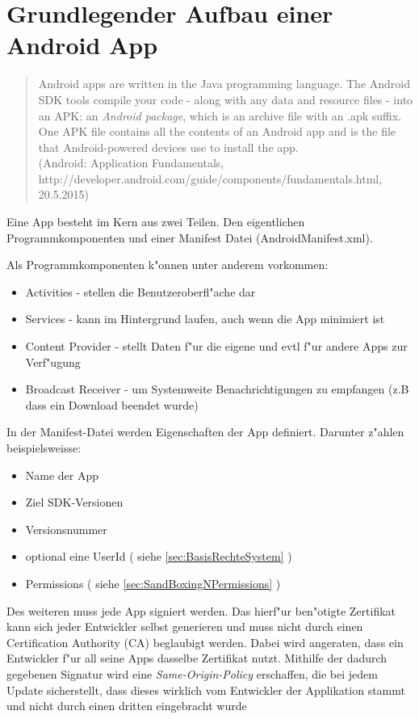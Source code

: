 	\section{Grundlegender Aufbau einer Android App}
	\begin{quote}
	Android apps are written in the Java programming language. The Android SDK tools compile your code - along with any data and resource files - into an APK: an \textit{Android package}, which is an archive file with an .apk suffix. One APK file contains all the contents of an Android app and is the file that Android-powered devices use to install the app.\\
	(Android: Application Fundamentals,\\ http://developer.android.com/guide/components/fundamentals.html,\\ 20.5.2015)
	\end{quote}
	
\begin{flushleft}
	Eine App besteht im Kern aus zwei Teilen. Den eigentlichen Programmkomponenten und einer Manifest Datei (AndroidManifest.xml).\\
\end{flushleft}
	Als Programmkomponenten k"onnen unter anderem vorkommen:
	\begin{itemize}\itemsep0pt
		\item Activities - stellen die Benutzeroberfl"ache dar
		\item Services - kann im Hintergrund laufen, auch wenn die App minimiert ist
		\item Content Provider - stellt Daten f"ur die eigene und evtl f"ur andere Apps zur Verf"ugung
		\item Broadcast Receiver - um Systemweite Benachrichtigungen zu empfangen (z.B dass ein Download beendet wurde)
	\end{itemize}
	In der Manifest-Datei werden Eigenschaften der App definiert. Darunter z"ahlen beispielsweisse:
	\begin{itemize}\itemsep0pt
		\item Name der App
		\item Ziel SDK-Versionen
		\item Versionsnummer
		\item optional eine UserId ( siehe \ref*{sec:BasisRechteSystem} )
		\item Permissions ( siehe \ref*{sec:SandBoxingNPermissions} )
	\end{itemize}
	Des weiteren muss jede App signiert werden. Das hierf"ur ben"otigte Zertifikat kann sich jeder Entwickler selbst generieren und muss nicht durch einen Certification Authority (CA) beglaubigt werden. Dabei wird angeraten, dass ein Entwickler f"ur all seine Apps dasselbe Zertifikat nutzt. Mithilfe der dadurch gegebenen Signatur wird eine \textit{Same-Origin-Policy} erschaffen, die bei jedem Update sicherstellt, dass dieses wirklich vom Entwickler der Applikation stammt und nicht durch einen dritten eingebracht wurde